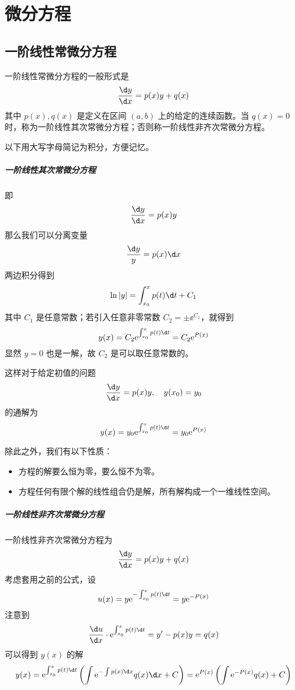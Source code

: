 \chapter{微分方程}

\section{一阶线性常微分方程}

一阶线性常微分方程的一般形式是
\[ \frac{\d y}{\d x} = p(x) y + q(x) \]
其中 $p(x), q(x)$ 是定义在区间 $(a, b)$ 上的给定的连续函数。当 $q(x) = 0$ 时，称为一阶线性其次常微分方程；否则称一阶线性非齐次常微分方程。

以下用大写字母简记为积分，方便记忆。

\paragraph{一阶线性其次常微分方程} 即
\[ \frac{\d y}{\d x} = p(x) y \]
那么我们可以分离变量
\[ \frac{\d y}{y} = p(x) \d x \]
两边积分得到
\[ \ln |y| = \int_{x_0}^{x} p(t) \d t + C_1 \]
其中 $C_1$ 是任意常数；若引入任意非零常数 $C_2 = \pm \ee^{C_1}$，就得到
\[ y(x) = C_2 \ee^{\int_{x_0}^{x} p(t) \d t } = C_2 \ee^{P(x)} \]
显然 $y = 0$ 也是一解，故 $C_2$ 是可以取任意常数的。

这样对于给定初值的问题
\[ \frac{\d y}{\d x} = p(x) y, \quad y(x_0) = y_0 \]
的通解为
\[ y(x) = y_0 \ee^{ \int_{x_0}^{x} p(t) \d t } = y_0 \ee^{P(x)} \]

除此之外，我们有以下性质：

\begin{itemize}
	\item 方程的解要么恒为零，要么恒不为零。
	\item 方程任何有限个解的线性组合仍是解，所有解构成一个一维线性空间。
\end{itemize}

\paragraph{一阶线性非齐次常微分方程} 一阶线性非齐次常微分方程为
\[ \frac{\d y}{\d x} = p(x) y + q(x) \]
考虑套用之前的公式，设
\[ u(x) = y \ee^{-\int_{x_0}^{x} p(t) \d t} = y \ee^{-P(x)} \]
注意到
\[ \frac{\d u}{\d x} \cdot \ee^{\int_{x_0}^{x} p(t) \d t} = y' - p(x) y = q(x) \]
可以得到 $y(x)$ 的解
\[ y(x) = \ee^{\int_{x_0}^{x} p(t) \d t} \left(  \int \ee^{-\int p(x) \d x} q(x) \d x + C \right)
= \ee^{P(x)} \left( \int \ee^{-P(x)} q(x) + C \right)  \]


